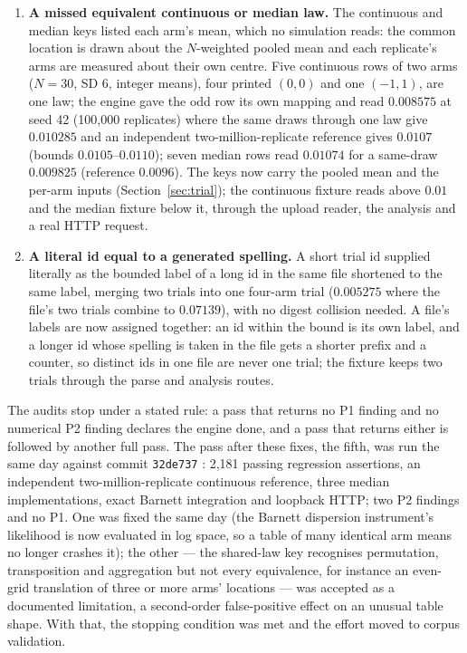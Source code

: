 \documentclass[11pt,a4paper]{article}
\begin{document}
\begin{enumerate}
\item \textbf{A missed equivalent continuous or median law.} The continuous and median keys listed each arm's mean, which no simulation reads: the common location is drawn about the $N$-weighted pooled mean and each replicate's arms are measured about their own centre. Five continuous rows of two arms ($N=30$, SD $6$, integer means), four printed $(0,0)$ and one $(-1,1)$, are one law; the engine gave the odd row its own mapping and read $0.008575$ at seed 42 (100,000 replicates) where the same draws through one law give $0.010285$ and an independent two-million-replicate reference gives $0.0107$ (bounds $0.0105$--$0.0110$); seven median rows read $0.01074$ for a same-draw $0.009825$ (reference $0.0096$). The keys now carry the pooled mean and the per-arm inputs (Section~\ref{sec:trial}); the continuous fixture reads above $0.01$ and the median fixture below it, through the upload reader, the analysis and a real HTTP request.
\item \textbf{A literal id equal to a generated spelling.} A short trial id supplied literally as the bounded label of a long id in the same file shortened to the same label, merging two trials into one four-arm trial ($0.005275$ where the file's two trials combine to $0.07139$), with no digest collision needed. A file's labels are now assigned together: an id within the bound is its own label, and a longer id whose spelling is taken in the file gets a shorter prefix and a counter, so distinct ids in one file are never one trial; the fixture keeps two trials through the parse and analysis routes.
\end{enumerate}
The audits stop under a stated rule: a pass that returns no P1 finding and no numerical P2 finding declares the engine done, and a pass that returns either is followed by another full pass. The pass after these fixes, the fifth, was run the same day against commit \texttt{32de737} \citep{auditreadme2026}: 2,181 passing regression assertions, an independent two-million-replicate continuous reference, three median implementations, exact Barnett integration and loopback HTTP; two P2 findings and no P1. One was fixed the same day (the Barnett dispersion instrument's likelihood is now evaluated in log space, so a table of many identical arm means no longer crashes it); the other --- the shared-law key recognises permutation, transposition and aggregation but not every equivalence, for instance an even-grid translation of three or more arms' locations --- was accepted as a documented limitation, a second-order false-positive effect on an unusual table shape. With that, the stopping condition was met and the effort moved to corpus validation.
\end{document}

